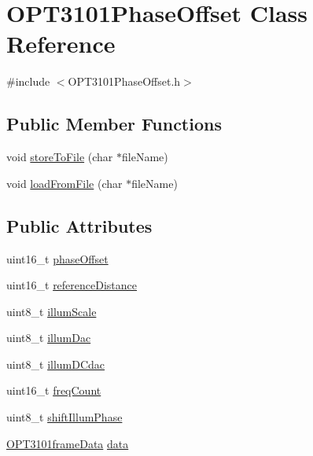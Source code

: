 \hypertarget{class_o_p_t3101_phase_offset}{}\section{O\+P\+T3101\+Phase\+Offset Class Reference}
\label{class_o_p_t3101_phase_offset}


{\ttfamily \#include $<$O\+P\+T3101\+Phase\+Offset.\+h$>$}

\subsection*{Public Member Functions}
\begin{DoxyCompactItemize}
\item 
void \mbox{\hyperlink{class_o_p_t3101_phase_offset_a47d5f7bf6a0222b42e8f3c1e553eaede}{store\+To\+File}} (char $\ast$file\+Name)
\item 
void \mbox{\hyperlink{class_o_p_t3101_phase_offset_a35781a5851ef0b8fe77b715ae2c77d7c}{load\+From\+File}} (char $\ast$file\+Name)
\end{DoxyCompactItemize}
\subsection*{Public Attributes}
\begin{DoxyCompactItemize}
\item 
uint16\+\_\+t \mbox{\hyperlink{class_o_p_t3101_phase_offset_aca656ee26f1868d189457f73b31d8e9c}{phase\+Offset}}
\item 
uint16\+\_\+t \mbox{\hyperlink{class_o_p_t3101_phase_offset_a42ea86c874297dfcd2d35a60a65f4cef}{reference\+Distance}}
\item 
uint8\+\_\+t \mbox{\hyperlink{class_o_p_t3101_phase_offset_a059f70a8580e87917bdec62ba96bdfed}{illum\+Scale}}
\item 
uint8\+\_\+t \mbox{\hyperlink{class_o_p_t3101_phase_offset_a3cf6d4a42ed5d9aa94b7240e20f3654b}{illum\+Dac}}
\item 
uint8\+\_\+t \mbox{\hyperlink{class_o_p_t3101_phase_offset_a7e4de690044ae4bdd60dba7f3143cc25}{illum\+D\+Cdac}}
\item 
uint16\+\_\+t \mbox{\hyperlink{class_o_p_t3101_phase_offset_a82070a039edc6c477e485665aa3700df}{freq\+Count}}
\item 
uint8\+\_\+t \mbox{\hyperlink{class_o_p_t3101_phase_offset_aeb2e9846adba048a437608ef70f2da5b}{shift\+Illum\+Phase}}
\item 
\mbox{\hyperlink{class_o_p_t3101frame_data}{O\+P\+T3101frame\+Data}} \mbox{\hyperlink{class_o_p_t3101_phase_offset_a10014460d27f74479885c44b7a07866e}{data}}
\end{DoxyCompactItemize}


